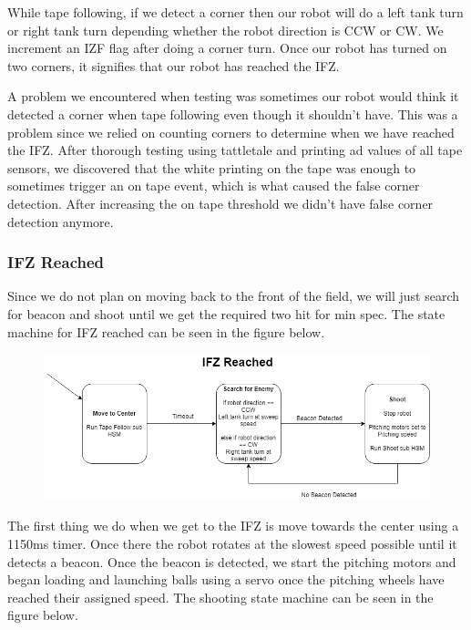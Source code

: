 \documentclass{article}
\begin{document}
While tape following, if we detect a corner then our robot will do a left tank turn or right tank turn depending whether the robot direction is CCW or CW.  We increment an IZF flag after doing a corner turn.  Once our robot has turned on two corners, it signifies that our robot has reached the IFZ.

A problem we encountered when testing was sometimes our robot would think it detected a corner when tape following even though it shouldn't have.  This was a problem since we relied on counting corners to determine when we have reached the IFZ.  After thorough testing using tattletale and printing ad values of all tape sensors, we discovered that the white printing on the tape was enough to sometimes trigger an on tape event, which is what caused the false corner detection.  After increasing the on tape threshold we didn't have false corner detection anymore.

\subsubsection{IFZ Reached}
Since we do not plan on moving back to the front of the field, we will just search for beacon and shoot until we get the required two hit for min spec.  The state machine for IFZ reached can be seen in the figure below.

\begin{figure}[H]
    \centering
    \includegraphics[scale = 0.5]{IFZReached.png}
\end{figure}

The first thing we do when we get to the IFZ is move towards the center using a 1150ms timer.  Once there the robot rotates at the slowest speed possible until it detects a beacon.  Once the beacon is detected, we start the pitching motors and began loading and launching balls using a servo once the pitching wheels have reached their assigned speed.  The shooting state machine can be seen in the figure below.
\end{document}
